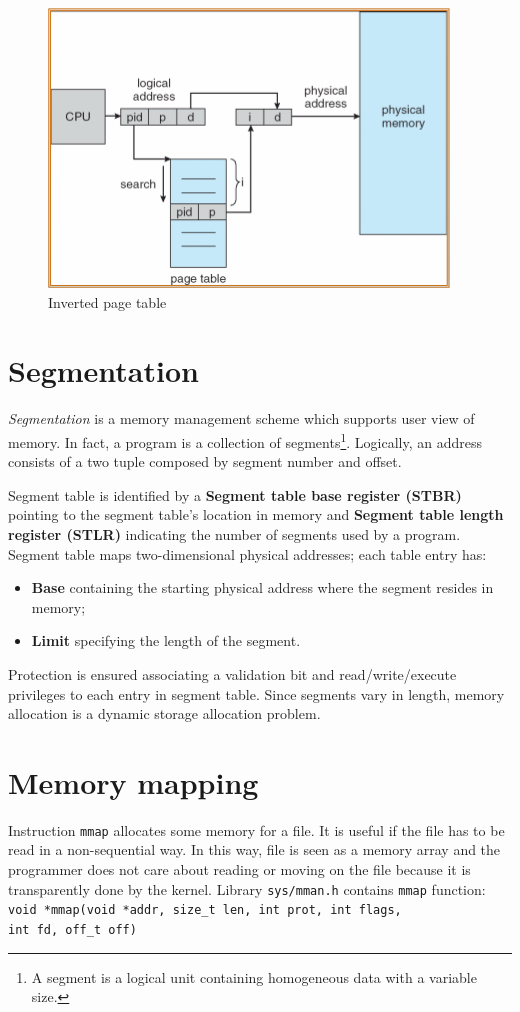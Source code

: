 \begin{figure}[hbtp]
\centering
\includegraphics[scale=0.4]{images/memory_management/inverted_pagetable.jpg}
\caption{Inverted page table}
\end{figure}

\section{Segmentation}
\emph{Segmentation} is a memory management scheme which supports user view of memory. In fact, a program is a collection of segments\footnote{A segment is a logical unit containing homogeneous data with a variable size.}. Logically, an address consists of a two tuple composed by segment number and offset.

Segment table is identified by a \textbf{Segment table base register (STBR)}  pointing to the segment table's location in memory and \textbf{Segment table length register (STLR)} indicating the number of segments used by a program. Segment table maps two-dimensional physical addresses; each table entry has:
\begin{itemize}
\item \textbf{Base} containing the starting physical address where the segment resides in memory;
\item \textbf{Limit} specifying the length of the segment.
\end{itemize}

Protection is ensured associating a validation bit and read/write/execute privileges to each entry in segment table. Since segments vary in length, memory allocation is a dynamic storage allocation problem.

\section*{Memory mapping}
Instruction \texttt{mmap} allocates some memory for a file. It is useful if the file has to be read in a non-sequential way. In this way, file is seen as a memory array and the programmer does not care about reading or moving on the file because it is transparently done by the kernel.
Library \texttt{sys/mman.h} contains \texttt{mmap} function:
\newline
\texttt{void *mmap(void *addr, size\_t len, int prot, int flags, \\ int fd, off\_t off)}

